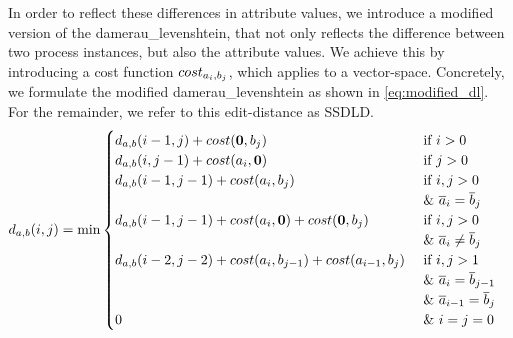 \documentclass[./../../paper.tex]{subfiles}
\begin{document}


\noindent In order to reflect these differences in attribute values, we introduce a modified version of the \gls{damerau_levenshtein}, that not only reflects the difference between two process instances, but also the attribute values. We achieve this by introducing a cost function $cost_{a_i, b_j}$, which applies to a vector-space. Concretely, we formulate the modified \gls{damerau_levenshtein} as shown in \autoref{eq:modified_dl}. For the remainder, we refer to this edit-distance as \gls{SSDLD}.
\begin{align}
    \label{eq:modified_dl}
    d_{a, b}(i, j) & =\min
    \begin{cases}
        d_{a, b}(i-1, j  )+cost(\mathbf{0}, b_j) & \text { if } i>0                                            \\
        d_{a, b}(i  , j-1)+cost(a_i, \mathbf{0}) & \text { if } j>0                                            \\
        d_{a, b}(i-1, j-1)+cost(a_i, b_j) & \text { if } i, j>0   \\ & \text { \& } \overline{a}_i=\overline{b}_j                                       \\
        d_{a, b}(i-1, j-1)+ cost(a_i, \mathbf{0}) +cost(\mathbf{0}, b_j)  & \text { if } i, j>0  \\ & \text { \& } \overline{a}_i \neq \overline{b}_j                                       \\
        d_{a, b}(i-2, j-2)+cost(a_i, b_{j-1}) + cost(a_{i-1}, b_j) & \text { if } i, j>1 \\ 
        & \text { \& } \overline{a}_i=\overline{b}_{j-1} \\ 
        & \text { \& } \overline{a}_{i-1}=\overline{b}_j \\
        0                                 & \text { \& } i=j=0                                          
    \end{cases} 
\end{align}
\end{document}

